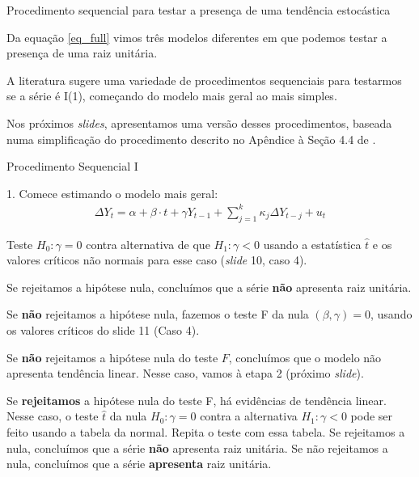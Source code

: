 \documentclass[11pt]{beamer}
\newenvironment{wideitemize}{\itemize\addtolength{\itemsep}{10pt}}{\enditemize}
\newenvironment{halfwideenumerate}{\enumerate\addtolength{\itemsep}{0.5em}}{\endenumerate}
\begin{document}
\begin{frame}{Procedimento sequencial para testar a presença de uma tendência estocástica}
	\begin{wideitemize}
		\item Da equação \eqref{eq_full} vimos três modelos diferentes em que podemos testar a presença de uma raiz unitária.
		\item A literatura sugere uma variedade de procedimentos {\color{blue}sequenciais} para testarmos se a série é I(1), começando do modelo mais geral ao mais simples.
		\item Nos próximos \textit{slides}, apresentamos uma versão desses procedimentos, baseada numa simplificação do procedimento descrito no Apêndice à Seção 4.4 de \citet{Enders2014}.
		
	\end{wideitemize}
\end{frame}

\begin{frame}{Procedimento Sequencial I}

	
		{ 1.} Comece estimando o modelo mais geral:
		\begin{equation*}
			\begin{aligned}
				\Delta Y_t = \alpha + \beta \cdot t + \gamma Y_{t-1}  +\sum_{j=1}^k \kappa_j\Delta Y_{t-j} + u_t
			\end{aligned}
		\end{equation*}
		
		Teste $H_0: \gamma = 0$ contra alternativa de que $H_1: \gamma < 0$ usando a estatística $\hat{t}$ e os valores críticos não normais para esse caso (\textit{slide} 10, caso 4).
		\begin{halfwideenumerate}
					\small
			\item Se rejeitamos a hipótese nula, concluímos que a série \textbf{não} apresenta raiz unitária.
			\item Se \textbf{não} rejeitamos a hipótese nula, fazemos o teste F da nula $(\beta, \gamma)=0$, usando os valores críticos do slide 11 (Caso 4).
			\begin{halfwideenumerate}
\footnotesize
				\item Se \textbf{não} rejeitamos a hipótese  nula do teste $F$, concluímos que o modelo não apresenta tendência linear. Nesse caso, vamos à etapa 2 (próximo \textit{slide}).
				\item Se \textbf{rejeitamos} a hipótese nula do teste F, há evidências de tendência linear. Nesse caso, o teste $\hat{t}$ da nula $H_0: \gamma = 0$ contra a alternativa  $H_1: \gamma < 0$ pode ser feito usando a tabela da normal. Repita o teste com essa tabela. Se rejeitamos a nula, concluímos que a série \textbf{não} apresenta raiz unitária. Se não rejeitamos a nula, concluímos que a série \textbf{apresenta} raiz unitária.
			\end{halfwideenumerate}
		\end{halfwideenumerate}
		

	
\end{frame}
\end{document}
